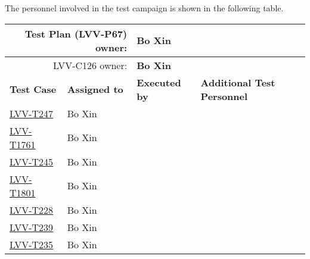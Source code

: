 \documentclass[SE,lsstdraft,STR,toc]{lsstdoc}
\begin{document}
The personnel involved in the test campaign is shown in the following table.

\begin{longtable}{p{3cm}p{3cm}p{3cm}p{6cm}}
\hline
\multicolumn{2}{r}{Test Plan (LVV-P67) owner:} &
\multicolumn{2}{l}{\textbf{ Bo Xin } }\\\hline
\multicolumn{2}{r}{ LVV-C126 owner:} &
\multicolumn{2}{l}{\textbf{
    Bo Xin
}
} \\\hline
\textbf{Test Case} & \textbf{Assigned to} & \textbf{Executed by} & \textbf{Additional Test Personnel} \\ \hline
\href{https://jira.lsstcorp.org/secure/Tests.jspa#/testCase/LVV-T247}{LVV-T247}
& {\small Bo Xin } & {\small  } &
\begin{minipage}[]{6cm}
\smallskip
{\small  }
\medskip
\end{minipage}
\\ \hline
\href{https://jira.lsstcorp.org/secure/Tests.jspa#/testCase/LVV-T1761}{LVV-T1761}
& {\small Bo Xin } & {\small  } &
\begin{minipage}[]{6cm}
\smallskip
{\small  }
\medskip
\end{minipage}
\\ \hline
\href{https://jira.lsstcorp.org/secure/Tests.jspa#/testCase/LVV-T245}{LVV-T245}
& {\small Bo Xin } & {\small  } &
\begin{minipage}[]{6cm}
\smallskip
{\small  }
\medskip
\end{minipage}
\\ \hline
\href{https://jira.lsstcorp.org/secure/Tests.jspa#/testCase/LVV-T1801}{LVV-T1801}
& {\small Bo Xin } & {\small  } &
\begin{minipage}[]{6cm}
\smallskip
{\small  }
\medskip
\end{minipage}
\\ \hline
\href{https://jira.lsstcorp.org/secure/Tests.jspa#/testCase/LVV-T228}{LVV-T228}
& {\small Bo Xin } & {\small  } &
\begin{minipage}[]{6cm}
\smallskip
{\small  }
\medskip
\end{minipage}
\\ \hline
\href{https://jira.lsstcorp.org/secure/Tests.jspa#/testCase/LVV-T239}{LVV-T239}
& {\small Bo Xin } & {\small  } &
\begin{minipage}[]{6cm}
\smallskip
{\small  }
\medskip
\end{minipage}
\\ \hline
\href{https://jira.lsstcorp.org/secure/Tests.jspa#/testCase/LVV-T235}{LVV-T235}
& {\small Bo Xin } & {\small  } &

\end{longtable}
\end{document}
